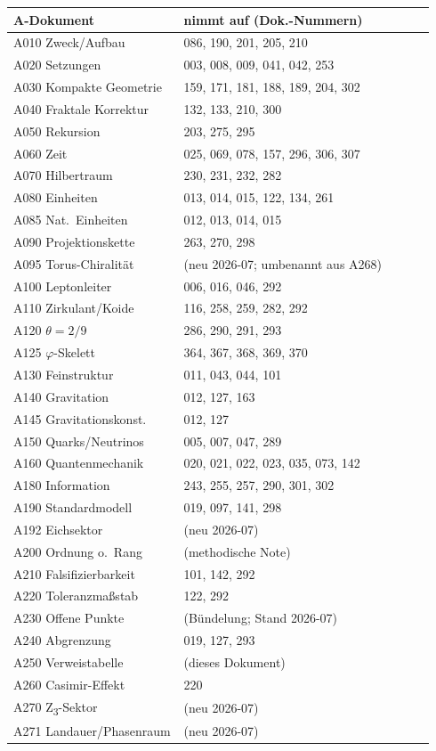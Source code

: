 \begin{center}
\small
\begin{longtable}{@{}p{0.38\linewidth}p{0.56\linewidth}@{}}
\hline
A-Dokument & nimmt auf (Dok.-Nummern) \\
\hline
\endhead
A010 Zweck/Aufbau        & 086, 190, 201, 205, 210 \\
A020 Setzungen           & 003, 008, 009, 041, 042, 253 \\
A030 Kompakte Geometrie  & 159, 171, 181, 188, 189, 204, 302 \\
A040 Fraktale Korrektur  & 132, 133, 210, 300 \\
A050 Rekursion           & 203, 275, 295 \\
A060 Zeit                & 025, 069, 078, 157, 296, 306, 307 \\
A070 Hilbertraum         & 230, 231, 232, 282 \\
A080 Einheiten           & 013, 014, 015, 122, 134, 261 \\
A085 Nat.\ Einheiten     & 012, 013, 014, 015 \\
A090 Projektionskette    & 263, 270, 298 \\
A095 Torus-Chiralität    & (neu 2026-07; umbenannt aus A268) \\
A100 Leptonleiter        & 006, 016, 046, 292 \\
A110 Zirkulant/Koide     & 116, 258, 259, 282, 292 \\
A120 $\theta=2/9$        & 286, 290, 291, 293 \\
A125 $\varphi$-Skelett    & 364, 367, 368, 369, 370 \\
A130 Feinstruktur        & 011, 043, 044, 101 \\
A140 Gravitation         & 012, 127, 163 \\
A145 Gravitationskonst.  & 012, 127 \\
A150 Quarks/Neutrinos    & 005, 007, 047, 289 \\
A160 Quantenmechanik     & 020, 021, 022, 023, 035, 073, 142 \\
A180 Information         & 243, 255, 257, 290, 301, 302 \\
A190 Standardmodell      & 019, 097, 141, 298 \\
A192 Eichsektor          & (neu 2026-07) \\
A200 Ordnung o.\ Rang    & (methodische Note) \\
A210 Falsifizierbarkeit  & 101, 142, 292 \\
A220 Toleranzmaßstab     & 122, 292 \\
A230 Offene Punkte       & (Bündelung; Stand 2026-07) \\
A240 Abgrenzung          & 019, 127, 293 \\
A250 Verweistabelle      & (dieses Dokument) \\
A260 Casimir-Effekt       & 220 \\
A270 Z\textsubscript{3}-Sektor & (neu 2026-07) \\
A271 Landauer/Phasenraum & (neu 2026-07) \\
\hline
\end{longtable}
\end{center}

